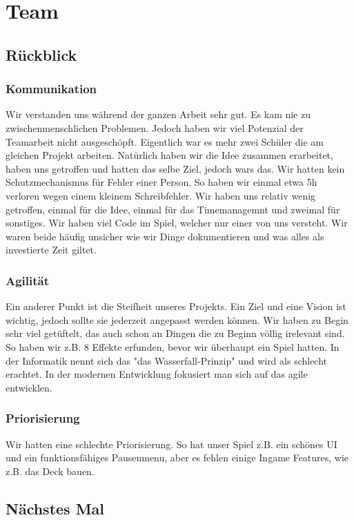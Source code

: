 \chapter{Team}

\section{Rückblick}

\subsection*{Kommunikation}
Wir verstanden uns während der ganzen Arbeit sehr gut.
Es kam nie zu zwischenmenschlichen Problemen. Jedoch haben wir viel Potenzial der Teamarbeit nicht ausgeschöpft.
Eigentlich war es mehr zwei Schüler die am gleichen Projekt arbeiten.
Natürlich haben wir die Idee zusammen erarbeitet, haben uns getroffen und hatten das selbe Ziel, jedoch wars das.
Wir hatten kein Schutzmechanismus für Fehler einer Person.
So haben wir einmal etwa 5h verloren wegen einem kleinem Schreibfehler.
Wir haben uns relativ wenig getroffen, einmal für die Idee, einmal für das Timemanagemnt und zweimal für sonstiges.
Wir haben viel Code im Spiel, welcher nur einer von uns versteht.
Wir waren beide häufig unsicher wie wir Dinge dokumentieren und was alles als investierte Zeit giltet.

\subsection*{Agilität}
Ein anderer Punkt ist die Steifheit unseres Projekts.
Ein Ziel und eine Vision ist wichtig, jedoch sollte sie jederzeit angepasst werden können.
Wir haben zu Begin sehr viel getüftelt, das auch schon an Dingen die zu Beginn völlig irelevant sind.
So haben wir z.B. 8 Effekte erfunden, bevor wir überhaupt ein Spiel hatten.
In der Informatik nennt sich das "das Wasserfall-Prinzip" und wird als schlecht erachtet.
In der modernen Entwicklung fokusiert man sich auf das agile entwicklen.

\subsection*{Priorisierung}
Wir hatten eine schlechte Priorisierung.
So hat unser Spiel z.B. ein schönes UI und ein funktionsfähiges Pausenmenu, aber es fehlen einige Ingame Features, wie z.B. das Deck bauen.


\section{Nächstes Mal}

